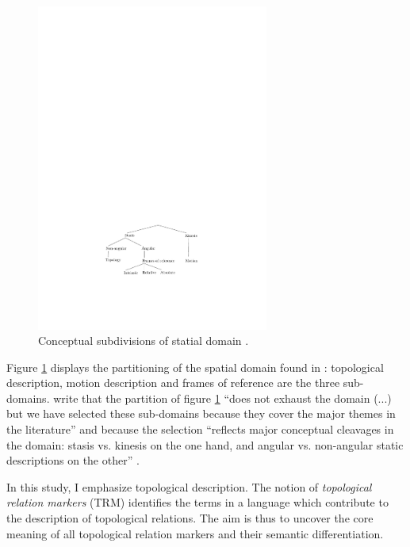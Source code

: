 \begin{figure}
 \centering
 \includegraphics[width=3in]{Graphic/Pictures/Levi-spatial-domain.pdf}
\caption{Conceptual
subdivisions of statial domain \cite[3]{Levi06}.
\label{fig:Levi-spat-dom}}
\end{figure}


Figure \ref{fig:Levi-spat-dom} displays the partitioning of the spatial domain
found in \cite{Levi06}:  topological description, motion description and frames
of reference are the three sub-domains.  \citeauthor{Levi06} write that the
partition of figure  \ref{fig:Levi-spat-dom} ``does not exhaust the domain (...)
but we have selected these sub-domains because they cover the major themes in
the literature'' and because the selection ``reflects major conceptual cleavages
in the
domain: stasis vs. kinesis on the one hand, and angular vs. non-angular static
descriptions on the other''  \citep[3]{Levi06}.  


In this study,  I  emphasize topological description. The notion of {\it
topological relation markers} (TRM) identifies the terms in a language which
contribute to the description of  topological relations. The aim is thus to
uncover
the core meaning of all  topological relation markers and their semantic
differentiation.





